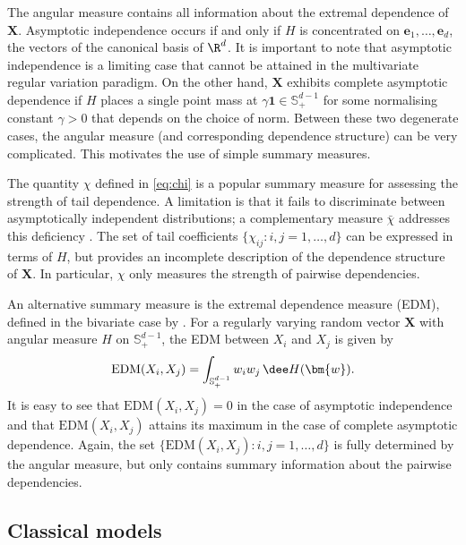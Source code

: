 \documentclass[en-GB, a4paper, nobind]{templates/bathreport}
\begin{document}
The angular measure contains all information about the extremal dependence of \(\bm{X}\). Asymptotic independence occurs if and only if \(H\) is concentrated on \(\bm{e}_1,\ldots,\bm{e}_d\), the vectors of the canonical basis of \(\R^d\). It is important to note that asymptotic independence is a limiting case that cannot be attained in the multivariate regular variation paradigm. On the other hand, \(\bm{X}\) exhibits complete asymptotic dependence if \(H\) places a single point mass at \(\gamma\bm{1}\in\mathbb{S}_+^{d-1}\) for some normalising constant \(\gamma>0\) that depends on the choice of norm. Between these two degenerate cases, the angular measure (and corresponding dependence structure) can be very complicated. This motivates the use of simple summary measures.

The quantity \(\chi\) defined in \eqref{eq:chi} is a popular summary measure for assessing the strength of tail dependence. A limitation is that it fails to discriminate between asymptotically independent distributions; a complementary measure \(\bar{\chi}\) addresses this deficiency \autocite[Section 8.4]{colesIntroductionStatisticalModeling2001}. The set of tail coefficients \(\{\chi_{ij}:i,j=1,\ldots,d\}\) can be expressed in terms of \(H\), but provides an incomplete description of the dependence structure of \(\bm{X}\). In particular, \(\chi\) only measures the strength of pairwise dependencies.

An alternative summary measure is the extremal dependence measure (EDM), defined in the bivariate case by \textcite{larssonExtremalDependenceMeasure2012}. For a regularly varying random vector \(\bm{X}\) with angular measure \(H\) on \(\mathbb{S}_+^{d-1}\), the EDM between \(X_i\) and \(X_j\) is given by
\begin{equation}
\mathrm{EDM}(X_i,X_j) = \int_{\mathbb{S}_+^{d-1}} w_i w_j \,\dee H(\bm{w}).
\label{eq:edm}
\end{equation}
It is easy to see that \(\mathrm{EDM}(X_i,X_j)=0\) in the case of asymptotic independence and that \(\mathrm{EDM}(X_i,X_j)\) attains its maximum in the case of complete asymptotic dependence. Again, the set \(\{\mathrm{EDM}(X_i,X_j):i,j=1,\ldots,d\}\) is fully determined by the angular measure, but only contains summary information about the pairwise dependencies.

\hypertarget{classical-models}{%
\subsection{Classical models}\label{classical-models}}
\end{document}
